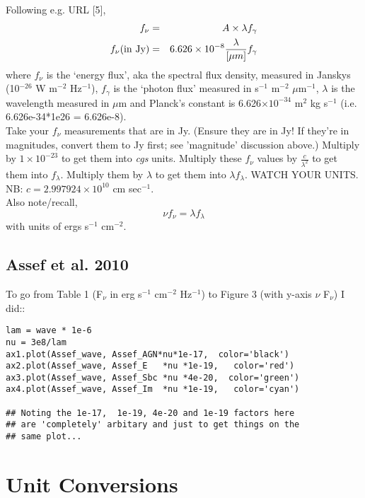 \documentclass[11pt,a4paper]{article}
\begin{document}
\noindent
Following e.g. URL [5], 
\begin{eqnarray}
f_{\nu}                      & = & A \times \lambda f_{\gamma}\\
f_{\nu} {\rm (in\ Jy)} & = & 6.626\times10^{-8} \frac{\lambda}{[\mu m]} f_{\gamma}\\
\end{eqnarray}
where $f_{\nu}$ is the `energy flux', aka the spectral flux density,
measured in Janskys (10$^{-26}$ W m$^{-2}$ Hz$^{-1}$), $f_{\gamma}$ is
the `photon flux' measured in s$^{-1}$ m$^{-2}$ $\mu$m$^{-1}$,
$\lambda$ is the wavelength measured in $\mu$m and Planck's constant
is 6.626$\times10^{-34}$ m$^{2}$ kg s$^{-1}$ (i.e. 6.626e-34*1e26 =
6.626e-8).\\

\noindent
Take your $f_{\nu}$ measurements that are in Jy. (Ensure they are in
Jy! If they're in magnitudes, convert them to Jy first; see
'magnitude' discussion above.) Multiply by $1\times10^{-23}$ to get
them into {\it cgs} units. Multiply these $f_{\nu}$ values by
$\frac{c}{\lambda^{2}}$ to get them into $f_{\lambda}$. Multiply them
by $\lambda$ to get them into $\lambda f_{\lambda}$. WATCH YOUR
UNITS. NB: $c = 2.997924\times10^{10}$ cm sec$^{-1}$. \\

\noindent
Also note/recall, 
\begin{equation}
  \nu  f_{\nu}    =  \lambda  f_{\lambda}
\end{equation}
with units of ergs s$^{-1}$ cm$^{-2}$. 

\subsection{Assef et al. 2010}
To go from Table 1 (F$_{\nu}$ in erg s$^{-1}$ cm$^{-2}$ Hz$^{-1}$) to Figure 3 (with y-axis $\nu$ F$_{\nu}$) I did:: 

\begin{lstlisting}
lam = wave * 1e-6
nu = 3e8/lam
ax1.plot(Assef_wave, Assef_AGN*nu*1e-17,  color='black')
ax2.plot(Assef_wave, Assef_E   *nu *1e-19,   color='red')
ax3.plot(Assef_wave, Assef_Sbc *nu *4e-20,  color='green')
ax4.plot(Assef_wave, Assef_Im  *nu *1e-19,   color='cyan')

## Noting the 1e-17,  1e-19, 4e-20 and 1e-19 factors here 
## are 'completely' arbitary and just to get things on the 
## same plot...
\end{lstlisting}


\section{Unit Conversions}
\end{document}
